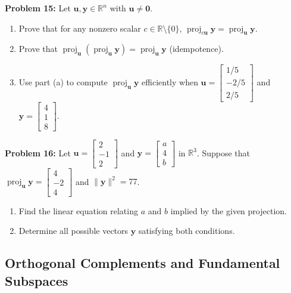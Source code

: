 \documentclass[11pt, letterpaper]{article}
\theoremstyle{definition}
\theoremstyle{remark}
\begin{document}
\textbf{Problem 15:} Let $\mathbf{u}, \mathbf{y} \in \mathbb{R}^n$ with $\mathbf{u} \neq \mathbf{0}$.
\begin{enumerate}[label=(\alph*)]
    \item Prove that for any nonzero scalar $c \in \mathbb{R} \setminus \{0\}$, $\operatorname{proj}_{c\mathbf{u}}\mathbf{y} = \operatorname{proj}_{\mathbf{u}}\mathbf{y}$.
    \item Prove that $\operatorname{proj}_{\mathbf{u}}(\operatorname{proj}_{\mathbf{u}}\mathbf{y}) = \operatorname{proj}_{\mathbf{u}}\mathbf{y}$ (idempotence).
    \item Use part (a) to compute $\operatorname{proj}_{\mathbf{u}}\mathbf{y}$ efficiently when $\mathbf{u} = \begin{bmatrix} 1/5 \\ -2/5 \\ 2/5 \end{bmatrix}$ and $\mathbf{y} = \begin{bmatrix} 4 \\ 1 \\ 8 \end{bmatrix}$.
\end{enumerate}

\textbf{Problem 16:} Let $\mathbf{u} = \begin{bmatrix} 2 \\ -1 \\ 2 \end{bmatrix}$ and $\mathbf{y} = \begin{bmatrix} a \\ 4 \\ b \end{bmatrix}$ in $\mathbb{R}^3$. Suppose that $\operatorname{proj}_{\mathbf{u}}\mathbf{y} = \begin{bmatrix} 4 \\ -2 \\ 4 \end{bmatrix}$ and $\|\mathbf{y}\|^2 = 77$.
\begin{enumerate}[label=(\alph*)]
    \item Find the linear equation relating $a$ and $b$ implied by the given projection.
    \item Determine all possible vectors $\mathbf{y}$ satisfying both conditions.
\end{enumerate}

\subsection{Orthogonal Complements and Fundamental Subspaces}
\end{document}

